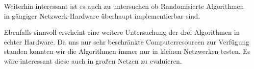 \documentclass[sigconf,noacm,review]{acmart}
\begin{document}
Weiterhin interessant ist es auch zu untersuchen ob Randomisierte Algorithmen in gängiger Netzwerk-Hardware überhaupt implementierbar sind.

Ebenfalls sinnvoll erscheint eine weitere Untersuchung der drei Algorithmen in echter Hardware.
Da uns nur sehr beschränkte Computerresourcen zur Verfügung standen konnten wir die Algorithmen immer nur in kleinen Netzwerken testen.
Es wäre interessant diese auch in großen Netzen zu evaluieren.








\appendix
\end{document}
